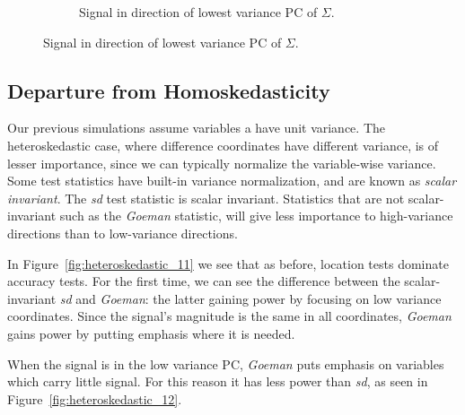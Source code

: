 \documentclass[12pt,a4paper]{article}
\begin{document}
\begin{figure}[h]
\begin{subfigure}[t]{.4\textwidth}
		\caption{Signal in direction of lowest variance PC of $\Sigma$.} 
		\label{fig:dependence_32}
	\end{subfigure}
\end{figure}



\subsection{Departure from Homoskedasticity}

Our previous simulations assume variables a have unit variance. 
The heteroskedastic case, where difference coordinates have different variance, is of lesser importance, since we can typically normalize the variable-wise variance. 
Some test statistics have built-in variance normalization, and are known as \emph{scalar invariant}. 
The \emph{sd} test statistic is scalar invariant. 
Statistics that are not scalar-invariant such as the \emph{Goeman} statistic, will give less importance to high-variance directions than to low-variance directions. 

In Figure~\ref{fig:heteroskedastic_11} we see that as before, location tests dominate accuracy tests.
For the first time, we can see the difference between the scalar-invariant \emph{sd} and \emph{Goeman}: the latter gaining power by focusing on low variance coordinates. Since the signal's magnitude is the same in all coordinates, \emph{Goeman} gains power by putting emphasis where it is needed.

When the signal is in the low variance PC, \emph{Goeman} puts emphasis on variables which carry little signal.
For this reason it has less power than \emph{sd}, as seen in Figure~\ref{fig:heteroskedastic_12}.
\end{document}
